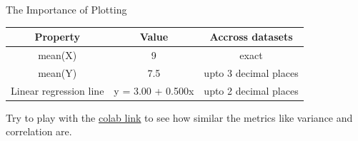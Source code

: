 \documentclass[usenames,dvipsnames]{beamer}
\begin{document}
\begin{frame}{The Importance of Plotting}
\begin{tabular}{|c|c|c|}
\hline 
Property & Value & Accross datasets \\ 
\hline 
mean(X) & 9 & exact \\ 
mean(Y) & 7.5 & upto 3 decimal places \\ 
Linear regression line & 	y = 3.00 + 0.500x & upto 2 decimal places \\ 
\hline 
\end{tabular} 

Try to play with the \href{https://colab.research.google.com/drive/12Rrh7sf_lR-WUd4nYciOAKiil5kqWPAq}{colab link} to see how similar the metrics like variance and correlation are.

\end{frame}
\end{document}
